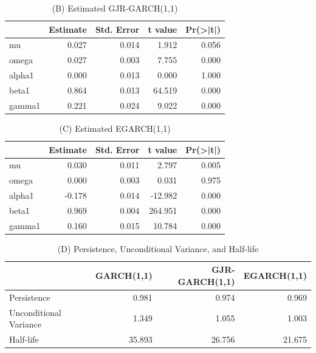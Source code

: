 \documentclass[]{book}
\theoremstyle{definition}
\theoremstyle{definition}
\theoremstyle{definition}
\theoremstyle{remark}
\begin{document}
\begin{table}

\caption{\label{tab:unnamed-chunk-11}(B) Estimated GJR-GARCH(1,1)}
\centering
\begin{tabular}[t]{l|r|r|r|r}
\hline
  &  Estimate &  Std. Error &  t value & Pr(>|t|)\\
\hline
mu & 0.027 & 0.014 & 1.912 & 0.056\\
\hline
omega & 0.027 & 0.003 & 7.755 & 0.000\\
\hline
alpha1 & 0.000 & 0.013 & 0.000 & 1.000\\
\hline
beta1 & 0.864 & 0.013 & 64.519 & 0.000\\
\hline
gamma1 & 0.221 & 0.024 & 9.022 & 0.000\\
\hline
\end{tabular}
\end{table}

\begin{table}

\caption{\label{tab:unnamed-chunk-11}(C) Estimated EGARCH(1,1)}
\centering
\begin{tabular}[t]{l|r|r|r|r}
\hline
  &  Estimate &  Std. Error &  t value & Pr(>|t|)\\
\hline
mu & 0.030 & 0.011 & 2.797 & 0.005\\
\hline
omega & 0.000 & 0.003 & 0.031 & 0.975\\
\hline
alpha1 & -0.178 & 0.014 & -12.982 & 0.000\\
\hline
beta1 & 0.969 & 0.004 & 264.951 & 0.000\\
\hline
gamma1 & 0.160 & 0.015 & 10.784 & 0.000\\
\hline
\end{tabular}
\end{table}

\begin{table}

\caption{\label{tab:unnamed-chunk-11}(D) Persistence, Unconditional Variance, and Half-life}
\centering
\begin{tabular}[t]{l|r|r|r}
\hline
  & GARCH(1,1) & GJR-GARCH(1,1) & EGARCH(1,1)\\
\hline
Persistence & 0.981 & 0.974 & 0.969\\
\hline
Unconditional Variance & 1.349 & 1.055 & 1.003\\
\hline
Half-life & 35.893 & 26.756 & 21.675\\
\hline
\end{tabular}
\end{table}
\end{document}
